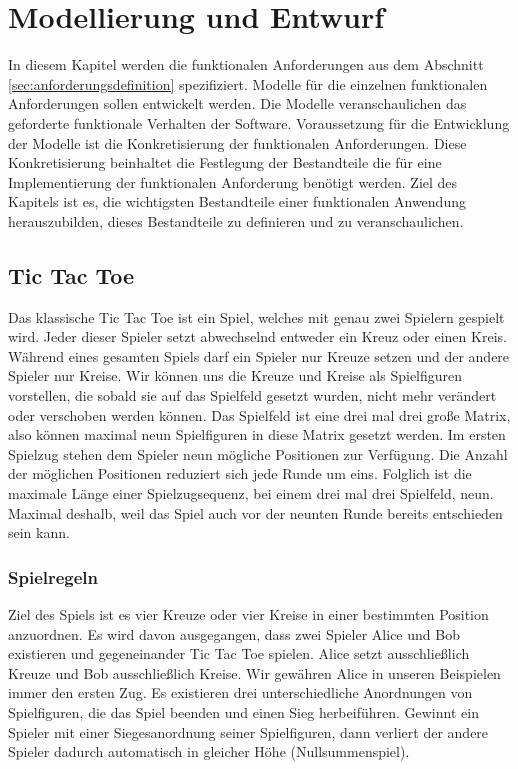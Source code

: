 \chapter{Modellierung und Entwurf}
\label{cha:Modellierung und Entwurf}

In diesem Kapitel werden die funktionalen Anforderungen aus dem Abschnitt \ref{sec:anforderungsdefinition} spezifiziert. Modelle für die einzelnen funktionalen Anforderungen sollen entwickelt werden. Die Modelle veranschaulichen das geforderte funktionale Verhalten der Software. Voraussetzung für die Entwicklung der Modelle ist die Konkretisierung der funktionalen Anforderungen. Diese Konkretisierung beinhaltet die Festlegung der Bestandteile die für eine Implementierung der funktionalen Anforderung benötigt werden. Ziel des Kapitels ist es, die wichtigsten Bestandteile einer funktionalen Anwendung herauszubilden, dieses Bestandteile zu definieren und zu veranschaulichen. 

\section{Tic Tac Toe}
\label{sec:Tic Tac Toe}

Das klassische Tic Tac Toe ist ein Spiel, welches mit genau zwei Spielern gespielt wird. Jeder dieser Spieler setzt abwechselnd entweder ein Kreuz oder einen Kreis. Während eines gesamten Spiels darf ein Spieler nur Kreuze setzen und der andere Spieler nur Kreise. Wir können uns die Kreuze und Kreise als Spielfiguren vorstellen, die sobald sie auf das Spielfeld gesetzt wurden, nicht mehr verändert oder verschoben werden können. Das Spielfeld ist eine drei mal drei große Matrix, also können maximal neun Spielfiguren in diese Matrix gesetzt werden. Im ersten Spielzug stehen dem Spieler neun mögliche Positionen zur Verfügung. Die Anzahl der möglichen Positionen reduziert sich jede Runde um eins. Folglich ist die maximale Länge einer Spielzugsequenz, bei einem drei mal drei Spielfeld, neun. Maximal deshalb, weil das Spiel auch vor der neunten Runde bereits entschieden sein kann. \\

\subsection{Spielregeln}
\label{subsec:Spielregeln}

Ziel des Spiels ist es vier Kreuze oder vier Kreise in einer bestimmten Position anzuordnen. Es wird davon ausgegangen, dass zwei Spieler Alice und Bob existieren und gegeneinander Tic Tac Toe spielen. Alice setzt ausschließlich Kreuze und Bob ausschließlich Kreise. Wir gewähren Alice in unseren Beispielen immer den ersten Zug. Es existieren drei unterschiedliche Anordnungen von Spielfiguren, die das Spiel beenden und einen Sieg herbeiführen. Gewinnt ein Spieler mit einer Siegesanordnung seiner Spielfiguren, dann verliert der andere Spieler dadurch automatisch in gleicher Höhe (Nullsummenspiel). \\

